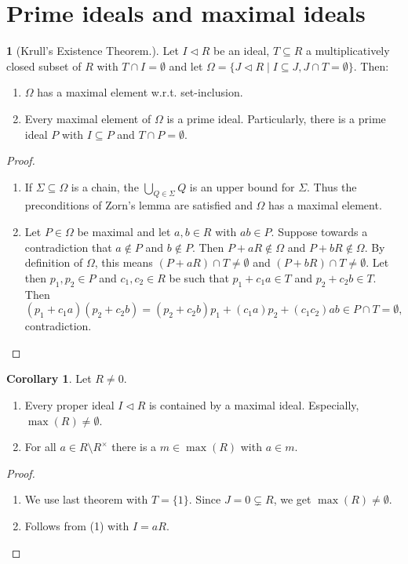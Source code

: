 \documentclass[12pt,a4paper]{report}
\theoremstyle{definition}
\newtheorem{corollary}[theorem]{Corollary} %
\theoremstyle{num.custom-title}
\newtheorem{teo_custom-title}[theorem]{} %
\DeclareMathOperator{\sm}{\setminus}
\DeclareMathOperator{\sse}{\subseteq}
\begin{document}
\section{Prime ideals and maximal ideals}

\begin{teo_custom-title}[Krull's Existence Theorem.] Let $I \lhd R$ be an ideal, $T \sse R$ a multiplicatively closed subset of $R$ with $T \cap I = \emptyset$ and let $\Omega=\{J \lhd R \mid I \sse J, J \cap T = \emptyset\}$. Then:
\begin{enumerate}
\item $\Omega$ has a maximal element w.r.t. set-inclusion.
\item Every maximal element of $\Omega$ is a prime ideal. Particularly, there is a prime ideal $P$ with $I \sse P$ and $T \cap P = \emptyset$.
\end{enumerate}
\begin{proof}\ 
\begin{enumerate}
\item If $\Sigma \sse \Omega$ is a chain, the $\bigcup_{Q \in \Sigma} Q$ is an upper bound for $\Sigma$. Thus the preconditions of Zorn's lemma are satisfied and $\Omega$ has a maximal element.
\item Let $P \in \Omega$ be maximal and let $a,b \in R$ with $ab \in P$. Suppose towards a contradiction that $a \not\in P$ and $b \not\in P$. Then $P+aR \not\in \Omega$ and $P+bR \not\in \Omega$. By definition of $\Omega$, this means $(P+aR) \cap T \neq \emptyset$ and $(P+bR) \cap T \neq \emptyset$. Let then $p_1,p_2 \in P$ and $c_1,c_2 \in R$ be such that $p_1+c_1 a \in T$ and $p_2+c_2 b \in T$. Then
\[
(p_1+c_1 a)(p_2+c_2 b)=(p_2+c_2 b)p_1 + (c_1 a) p_2 + (c_1 c_2)ab \in P \cap T = \emptyset,
\]
contradiction.
\end{enumerate}
\end{proof}
\end{teo_custom-title}

\begin{corollary}
Let $R \neq 0$.
\begin{enumerate}
\item Every proper ideal $I \lhd R$ is contained by a maximal ideal. Especially, $\max(R) \neq \emptyset$.
\item For all $a \in R \sm R^\times$ there is a $m \in \max(R)$ with $a \in m$.
\end{enumerate}
\begin{proof}\ 
\begin{enumerate}
\item We use last theorem with $T=\{1\}$. Since $J=0 \subsetneq R$, we get $\max(R) \neq \emptyset$.
\item Follows from (1) with $I=aR$.
\end{enumerate}
\end{proof}
\end{corollary}
\end{document}
